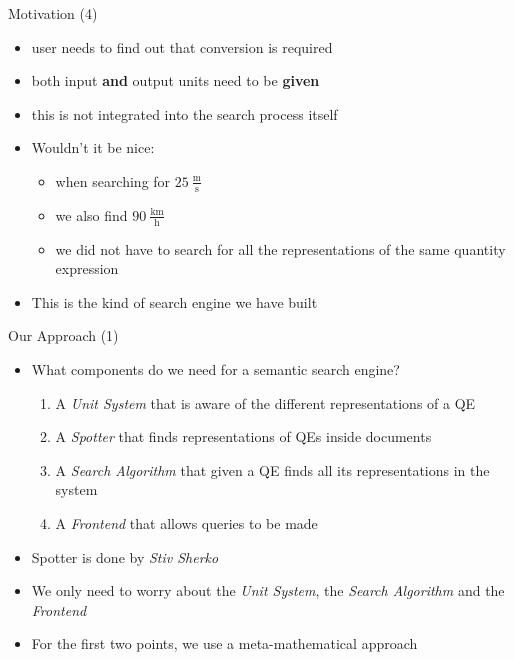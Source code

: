 \documentclass{beamer}
\begin{document}
  \begin{frame}{Motivation (4)}
    \begin{itemize}[<+->]
      \item user needs to find out that conversion is required
      \item both input \textbf{and} output units need to be \textbf{given}
      \item this is not integrated into the search process itself
      \item Wouldn't it be nice:
      \begin{itemize}[<+->]
        \item when searching for $25\ \frac{\text{m}}{\text{s}}$
        \item we also find $90\ \frac{\text{km}}{\text{h}}$
        \item we did not have to search for all the representations of the same quantity expression
      \end{itemize}
      \item This is the kind of search engine we have built
    \end{itemize}
  \end{frame}

  \begin{frame}{Our Approach (1)}
    \begin{itemize}[<+->]
      \item What components do we need for a semantic search engine?
      \begin{enumerate}[<+->]
        \item A \textit{Unit System} that is aware of the different representations of a QE
        \item A \textit{Spotter} that finds representations of QEs inside documents
        \item A \textit{Search Algorithm} that given a QE finds all its representations in the system
        \item A \textit{Frontend} that allows queries to be made
      \end{enumerate}

      \item Spotter is done by \textit{Stiv Sherko}
      \item We only need to worry about the \textit{Unit System}, the \textit{Search Algorithm} and the \textit{Frontend}
      \item For the first two points, we use a meta-mathematical approach
    \end{itemize}
  \end{frame}
\end{document}
